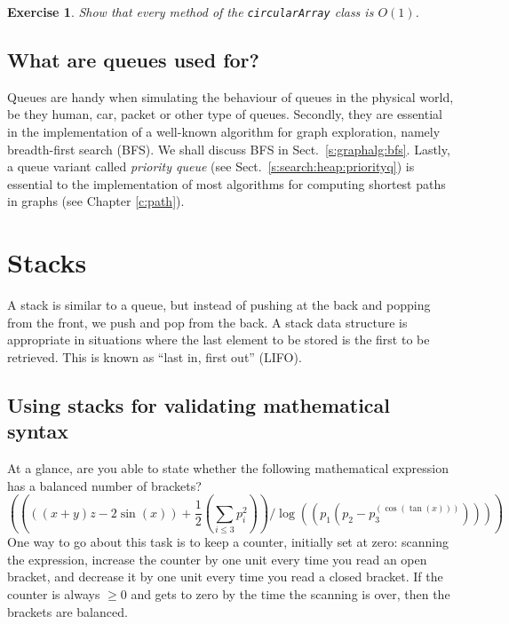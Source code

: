 \documentclass[a4paper]{book}
\theoremstyle{changebreak}                %
\newtheorem{ex}[result]{Exercise}
\begin{document}
\begin{ex}
Show that every method of the {\tt circularArray} class is $O(1)$.
\end{ex}

\subsection{What are queues used for?}
Queues are handy when simulating the behaviour of queues in the
physical world, be they human, car, packet or other type of
queues. Secondly, they are essential in the
implementation of a well-known algorithm for graph
exploration, namely breadth-first search
(BFS). We shall discuss BFS in
Sect.~\ref{s:graphalg:bfs}. Lastly, a queue variant called {\it
  priority queue} (see
Sect.~\ref{s:search:heap:priorityq}) is essential to the
implementation of most algorithms for computing shortest paths in
graphs (see Chapter \ref{c:path}).

\section{Stacks}
\label{s:linear:stack}
A stack is similar to a queue, but instead of pushing at
the back and popping from the front, we push and
pop from the back. A stack data structure is
appropriate in situations where the last element to be stored is the
first to be retrieved. This is known as ``last in, first out''
(LIFO).

\subsection{Using stacks for validating mathematical syntax}
At a glance, are you able to state whether the following mathematical
expression has a balanced number of brackets?
\begin{equation*}
  \left((((x+y)z-2\sin(x))+\frac{1}{2}\left(\sum_{i\le
    3}p_i^2\right))/\log((p_1(p_2-p_3^{(\cos(\tan(x)))})))\right)
\end{equation*}
One way to go about this task is to keep a counter, initially set at
zero: scanning the expression, increase the counter by one unit every
time you read an open bracket, and decrease it by one unit every time
you read a closed bracket. If the counter is always $\ge 0$ and gets
to zero by the time the scanning is over, then the brackets are
balanced. 
\end{document}
